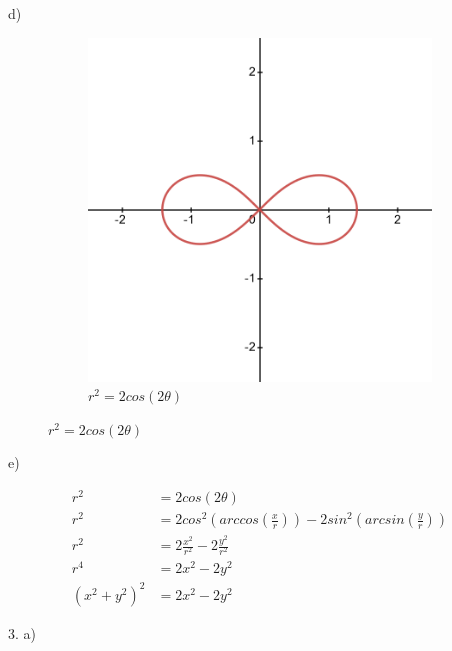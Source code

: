 \documentclass[11pt]{article}
\begin{document}
\begin{flushleft}
d) \bigskip
\begin{figure}[h]
\centering
	\begin{subfigure}[b]{0.3\textwidth}
	\includegraphics[width=\textwidth]{r=sqrt2cos2theta.png}
	\caption{$r^2=2cos(2\theta)$}
	\end{subfigure}
\end{figure}

\newpage

e) \bigskip

\begin{align*}
	r^2 &= 2cos(2\theta) \\
	r^2 &= 2cos^2(arccos(\frac{x}{r})) -2sin^2(arcsin(\frac{y}{r}))\\
	r^2 &= 2\frac{x^2}{r^2} -2\frac{y^2}{r^2}	 \\
	r^4 &= 2x^2 -2y^2 \\
	(x^2+y^2)^2 &= 2x^2 -2y^2
\end{align*}

\newpage

3. a) \bigskip


\end{flushleft}
\end{document}
